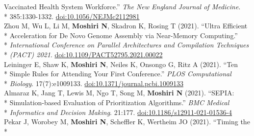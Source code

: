 \documentclass[margin,line]{res}
\begin{document}
\begin{resume}
\hspace*{9mm} Vaccinated Health System Workforce.'' \textit{The New England Journal of Medicine}.\\*\vspace{2mm}
\hspace*{8mm} 385:1330-1332. \href{https://doi.org/10.1056/NEJMc2112981}{doi:10.1056/NEJMc2112981}\\
\hspace*{4mm} Zhou M, Wu L, Li M, \textbf{Moshiri N}, Skadron K, Rosing T (2021). ``Ultra Efficient\\*
\hspace*{9mm} Acceleration for De Novo Genome Assembly via Near-Memory Computing.''\\*
\hspace*{9mm} \textit{International Conference on Parallel Architectures and Compilation Techniques}\\*\vspace{2mm}
\hspace*{8mm} \textit{(PACT) 2021}. \href{https://doi.org/10.1109/PACT52795.2021.00022}{doi:10.1109/PACT52795.2021.00022}\\
\hspace*{4mm} Leininger E, Shaw K, \textbf{Moshiri N}, Neiles K, Onsongo G, Ritz A (2021). ``Ten\\*
\hspace*{9mm} Simple Rules for Attending Your First Conference.'' \textit{PLOS Computational}\\*\vspace{2mm}
\hspace*{8mm} \textit{Biology}. 17(7):e1009133. \href{https://doi.org/10.1371/journal.pcbi.1009133}{doi:10.1371/journal.pcbi.1009133}\\
\hspace*{4mm} Almaraz K, Jang T, Lewis M, Ngo T, Song M, \textbf{Moshiri N} (2021). ``SEPIA:\\*
\hspace*{9mm} Simulation-based Evaluation of Prioritization Algorithms.'' \textit{BMC Medical}\\*\vspace{2mm}
\hspace*{8mm} \textit{Informatics and Decision Making}. 21:177. \href{https://doi.org/10.1186/s12911-021-01536-4}{doi:10.1186/s12911-021-01536-4}\\
\hspace*{4mm} Pekar J, Worobey M, \textbf{Moshiri N}, Scheffler K, Wertheim JO (2021). ``Timing the\\*

\end{resume}
\end{document}
